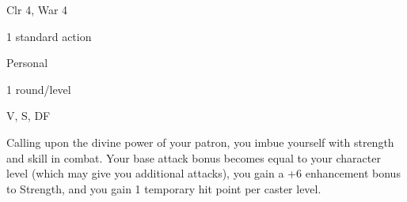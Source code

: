 
\begin{description*}
\item[Level:] Clr 4, War 4
\item[Casting Time:] 1 standard action
\item[Range:] Personal
\item[Duration:] 1 round/level
\item[Components:] V, S, DF
\end{description*}

Calling upon the divine power of your patron, you imbue yourself with strength
and skill in combat. Your base attack bonus becomes equal to your character level
(which may give you additional attacks), you gain a +6 enhancement bonus to Strength,
and you gain 1 temporary hit point per caster level.